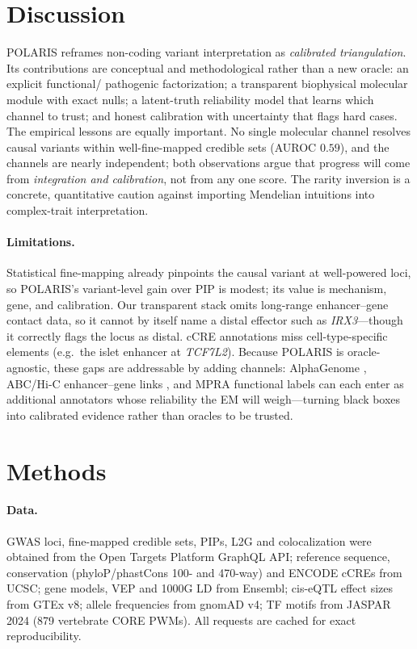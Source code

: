 \documentclass[10pt]{article}
\begin{document}
\section{Discussion}
POLARIS reframes non-coding variant interpretation as \emph{calibrated triangulation}. Its
contributions are conceptual and methodological rather than a new oracle: an explicit functional/%
pathogenic factorization; a transparent biophysical molecular module with exact nulls; a latent-truth
reliability model that learns which channel to trust; and honest calibration with uncertainty that flags
hard cases. The empirical lessons are equally important. No single molecular channel resolves causal
variants within well-fine-mapped credible sets (AUROC $0.59$), and the channels are nearly independent;
both observations argue that progress will come from \emph{integration and calibration}, not from any
one score. The rarity inversion is a concrete, quantitative caution against importing Mendelian
intuitions into complex-trait interpretation.

\paragraph{Limitations.} Statistical fine-mapping already pinpoints the causal variant at well-powered
loci, so POLARIS's variant-level gain over PIP is modest; its value is mechanism, gene, and calibration.
Our transparent stack omits long-range enhancer--gene contact data, so it cannot by itself name a distal
effector such as \emph{IRX3}---though it correctly flags the locus as distal. cCRE annotations miss
cell-type-specific elements (e.g.\ the islet enhancer at \emph{TCF7L2}). Because POLARIS is
oracle-agnostic, these gaps are addressable by adding channels: AlphaGenome \citep{avsec2025alphagenome},
ABC/Hi-C enhancer--gene links \citep{nasser2021abc}, and MPRA functional labels \citep{tewhey2016mpra}
can each enter as additional annotators whose reliability the EM will weigh---turning black boxes into
calibrated evidence rather than oracles to be trusted.

\section{Methods}
\paragraph{Data.} GWAS loci, fine-mapped credible sets, PIPs, L2G and colocalization were obtained from
the Open Targets Platform GraphQL API; reference sequence, conservation (phyloP/phastCons 100- and
470-way) and ENCODE cCREs from UCSC; gene models, VEP and 1000G LD from Ensembl; cis-eQTL effect sizes
from GTEx v8; allele frequencies from gnomAD v4; TF motifs from JASPAR 2024 (879 vertebrate CORE PWMs).
All requests are cached for exact reproducibility.
\end{document}
